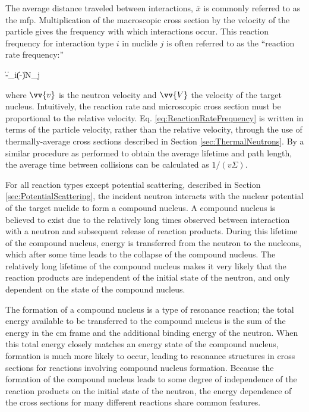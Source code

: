 The average distance traveled between interactions, \(\bar{x}\) is commonly referred to as the \gls{mfp}. Multiplication of the macroscopic cross section by the velocity of the particle gives the frequency with which interactions occur. This reaction frequency for interaction type \(i\) in nuclide \(j\) is often referred to as the ``reaction rate frequency:''

\beq
\label{eq:ReactionRateFrequency}
\equiv \|-\|\sigma_i(\|-\|)N_j
\eeq

where \(\vv{v}\) is the neutron velocity and \(\vv{V}\) the velocity of the target nucleus. Intuitively, the reaction rate and microscopic cross section must be proportional to the relative velocity. Eq. \eqref{eq:ReactionRateFrequency} is written in terms of the particle velocity, rather than the relative velocity, through the use of thermally-average cross sections described in Section \ref{sec:ThermalNeutrons}. By a similar procedure as performed to obtain the average lifetime and path length, the average time between collisions can be calculated as \(1/(v\Sigma)\).\

For all reaction types except potential scattering, described in Section \ref{sec:PotentialScattering}, the incident neutron interacts with the nuclear potential of the target nuclide to form a compound nucleus. A compound nucleus is believed to exist due to the relatively long times observed between interaction with a neutron and subsequent release of reaction products. During this lifetime of the compound nucleus, energy is transferred from the neutron to the nucleons, which after some time leads to the collapse of the compound nucleus. The relatively long lifetime of the compound nucleus makes it very likely that the reaction products are independent of the initial state of the neutron, and only dependent on the state of the compound nucleus. 

The formation of a compound nucleus is a type of resonance reaction; the total energy available to be transferred to the compound nucleus is the sum of the energy in the \gls{cm} frame and the additional binding energy of the neutron. When this total energy closely matches an energy state of the compound nucleus, formation is much more likely to occur, leading to resonance structures in cross sections for reactions involving compound nucleus formation. Because the formation of the compound nucleus leads to some degree of independence of the reaction products on the initial state of the neutron, the energy dependence of the cross sections for many different reactions share common features. 

